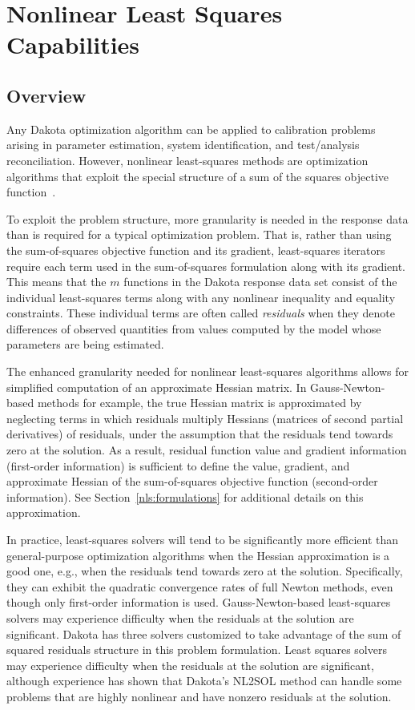 \chapter{Nonlinear Least Squares Capabilities}\label{nls}
\section{Overview}\label{nls:overview}
Any Dakota optimization algorithm can be applied to calibration
problems arising in parameter estimation, system identification, and
test/analysis reconciliation. However, nonlinear least-squares
methods are optimization algorithms that exploit the special structure
of a sum of the squares objective function~\cite{Gil81}.

To exploit the problem structure, more granularity is needed in the
response data than is required for a typical optimization problem.
That is, rather than using the sum-of-squares objective function and
its gradient, least-squares iterators require each term used in the
sum-of-squares formulation along with its gradient. This means that
the $m$ functions in the Dakota response data set consist of the
individual least-squares terms along with any nonlinear inequality and
equality constraints. These individual terms are often called
\emph{residuals} when they denote differences of observed quantities
from values computed by the model whose parameters are being
estimated.

The enhanced granularity needed for nonlinear least-squares algorithms
allows for simplified computation of an approximate Hessian matrix.
In Gauss-Newton-based methods for example, the true Hessian matrix is
approximated by neglecting terms in which residuals multiply Hessians
(matrices of second partial derivatives) of residuals, under the
assumption that the residuals tend towards zero at the solution. As a
result, residual function value and gradient information (first-order
information) is sufficient to define the value, gradient, and
approximate Hessian of the sum-of-squares objective function
(second-order information). See Section~\ref{nls:formulations} for
additional details on this approximation.

In practice, least-squares solvers will tend to be significantly more
efficient than general-purpose optimization algorithms when the
Hessian approximation is a good one, e.g., when the residuals tend
towards zero at the solution. Specifically, they can exhibit the
quadratic convergence rates of full Newton methods, even though only
first-order information is used. Gauss-Newton-based least-squares
solvers may experience difficulty when the residuals at the solution
are significant. Dakota has three solvers customized to take
advantage of the sum of squared residuals structure in this problem
formulation. Least squares solvers may experience difficulty when the
residuals at the solution are significant, although experience has
shown that Dakota's NL2SOL method can handle some problems that are
highly nonlinear and have nonzero residuals at the solution.

